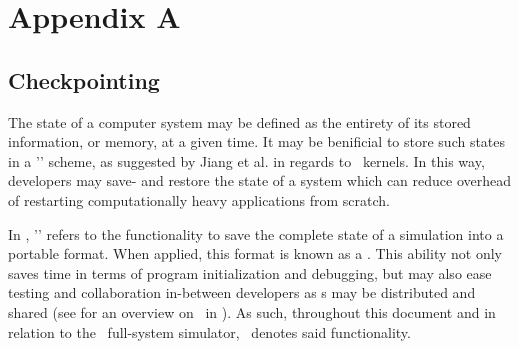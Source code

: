 
\chapter*{Appendix A}
\label{cha:appendixa}

\section{Checkpointing}
\label{sec:appendixa_checkpointing}
The state of a computer system may be defined as the entirety of its stored information, or memory, at a given time.
It may be benificial to store such states in a '\dvttermcheckpointrestart ' scheme, as suggested by Jiang et al. in regards to \dvttermcuda\ kernels.
In this way, developers may save- and restore the state of a system which can reduce overhead of restarting computationally heavy applications from scratch.

In \dvttermsimics , '\dvttermcheckpointing ' refers to the functionality to save the complete state of a simulation into a portable format.
When applied, this format is known as a \dvttermcheckpoint .
This ability not only  saves time in terms of program initialization and debugging, but may also ease testing and collaboration in-between developers as \dvttermcheckpoint s may be distributed and shared (see  for an overview on \dvttermcheckpointing\ in \dvttermsimics ).
As such, throughout this document and in relation to the \dvttermsimics\ full-system simulator, \dvttermcheckpointing\ denotes said functionality.

